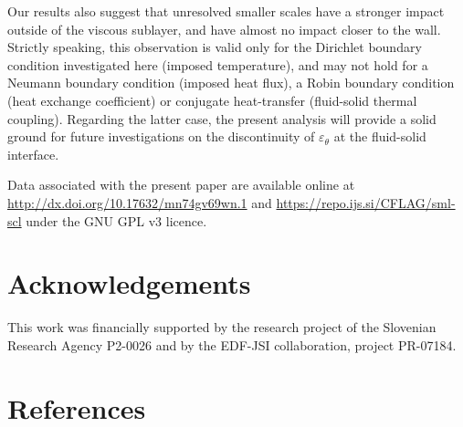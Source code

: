 \documentclass[review]{elsarticle}
\newcommand{\epst}{\varepsilon_\theta}
\begin{document}
Our results also {\color{red}suggest} that {\color{red}unresolved} smaller scales have a stronger impact outside of the viscous sublayer, and have almost no impact closer to the wall. Strictly speaking, this observation is valid only for the Dirichlet boundary condition investigated here (imposed temperature), and may not hold for a Neumann boundary condition (imposed heat flux), a Robin boundary condition (heat exchange coefficient) or conjugate heat-transfer (fluid-solid thermal coupling). Regarding the latter case, the present analysis will provide a solid ground for future investigations on the discontinuity of $\epst$ at the fluid-solid interface.

Data associated with the present paper are available online at \url{http://dx.doi.org/10.17632/mn74gv69wn.1} and \url{https://repo.ijs.si/CFLAG/sml-scl} under the GNU GPL v3 licence.

\section*{Acknowledgements}

This work was financially supported by the research project of the Slovenian Research Agency P2-0026 and by the EDF-JSI collaboration, project PR-07184.

\section*{References}


\end{document}
